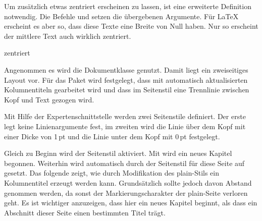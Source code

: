 Um zusätzlich etwas zentriert erscheinen zu lassen, ist eine erweiterte
Definition notwendig.
Die Befehle  und  setzen die übergebenen Argumente.
Für \LaTeX{} erscheint es aber so, dass diese Texte eine Breite von Null
haben. Nur so erscheint der mittlere Text auch wirklich zentriert.
%
\begin{lstcode}
  {\rlap{\headmark}\hfill zentriert\hfill\llap{\pagemark}}
\end{lstcode}

\iffalse%
Dies und die Verwendung der Expertenschnittstelle in Zusammenhang mit
anderen Befehlen von \Package{scrpage2} nun als abschließendes Beispiel.
\fi

\begin{Example}
  Angenommen es wird die Dokumentklasse  genutzt.  Damit
  liegt ein zweiseitiges Layout vor.  Für das Paket  wird
  festgelegt, dass mit automatisch aktualisierten Kolumnentiteln gearbeitet
  wird und dass im Seitenstil  eine Trennlinie zwischen
  Kopf und Text gezogen wird.


  Mit Hilfe der Expertenschnittstelle werden zwei Seitenstile definiert. Der
  erste legt keine Linienargumente fest, im zweiten wird die Linie über dem
  Kopf mit einer Dicke von 1\,pt und die Linie unter dem Kopf mit 0\,pt
  festgelegt.

\begin{lstcode}
\end{lstcode}

  Gleich zu Beginn wird der Seitenstil  aktiviert.  Mit
   wird ein neues Kapitel begonnen.  Weiterhin wird automatisch
  durch  der Seitenstil für diese Seite auf 
  gesetzt.  Das folgende  zeigt, wie durch Modifikation des
  plain-Stils ein Kolumnentitel erzeugt werden kann.  Grundsätzlich sollte
  jedoch davon Abstand genommen werden, da sonst der Markierungscharakter der
  plain-Seite verloren geht. Es ist wichtiger anzuzeigen, dass hier ein neues
  Kapitel beginnt, als dass ein Abschnitt dieser Seite einen bestimmten Titel
  trägt.


\end{Example}
